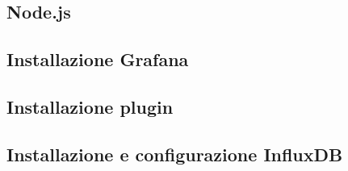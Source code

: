 \subsection{Node.js}
\subsection{Installazione Grafana}
\subsection{Installazione plugin}
\subsection{Installazione e configurazione InfluxDB}